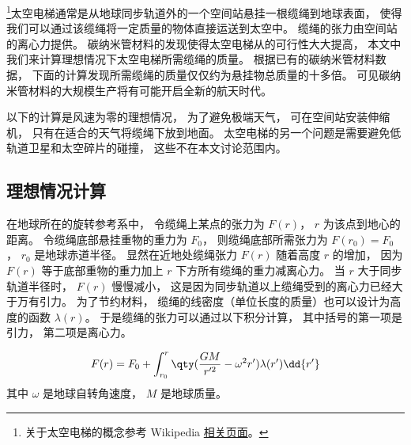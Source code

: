 

\footnote{关于太空电梯的概念参考 Wikipedia \href{https://en.wikipedia.org/wiki/Space_elevator}{相关页面}。}太空电梯通常是从地球同步轨道外的一个空间站悬挂一根缆绳到地球表面， 使得我们可以通过该缆绳将一定质量的物体直接运送到太空中。 缆绳的张力由空间站的离心力提供。 碳纳米管材料的发现使得太空电梯从的可行性大大提高， 本文中我们来计算理想情况下太空电梯所需缆绳的质量。 根据已有的碳纳米管材料数据， 下面的计算发现所需缆绳的质量仅仅约为悬挂物总质量的十多倍。 可见碳纳米管材料的大规模生产将有可能开启全新的航天时代。

以下的计算是风速为零的理想情况， 为了避免极端天气， 可在空间站安装伸缩机， 只有在适合的天气将缆绳下放到地面。 太空电梯的另一个问题是需要避免低轨道卫星和太空碎片的碰撞， 这些不在本文讨论范围内。

\subsection{理想情况计算}
在地球所在的旋转参考系中， 令缆绳上某点的张力为 $F(r)$， $r$ 为该点到地心的距离。 令缆绳底部悬挂重物的重力为 $F_0$， 则缆绳底部所需张力为 $F(r_0) = F_0$， $r_0$ 是地球赤道半径。 显然在近地处缆绳张力 $F(r)$ 随着高度 $r$ 的增加， 因为 $F(r)$ 等于底部重物的重力加上 $r$ 下方所有缆绳的重力减离心力。 当 $r$ 大于同步轨道半径时， $F(r)$ 慢慢减小， 这是因为同步轨道以上缆绳受到的离心力已经大于万有引力。 为了节约材料， 缆绳的线密度（单位长度的质量）也可以设计为高度的函数 $\lambda(r)$。 于是缆绳的张力可以通过以下积分计算， 其中括号的第一项是引力， 第二项是离心力。

\begin{equation}\label{SpcLad_eq1}
F(r) = F_0 + \int_{r_0}^{r} \qty(\frac{GM}{r'^2} - \omega^2 r') \lambda(r') \dd{r'}
\end{equation}
其中 $\omega$ 是地球自转角速度， $M$ 是地球质量。

